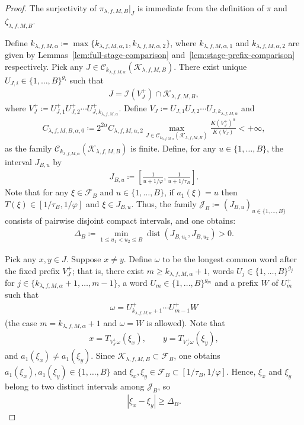 \documentclass[12pt,reqno]{amsart}
\theoremstyle{definition}
\theoremstyle{plain}
\begin{document}
\begin{proof}
The surjectivity of $\pi_{\lambda,f,M,B}|_J$ is immediate from the definition of $\pi$ and $\zeta_{\lambda,f,M,B}$.

Define $k_{\lambda,f,M,\alpha}\coloneqq \max{\{k_{\lambda,f,M,\alpha,1},k_{\lambda,f,M,\alpha,2}\}}$, where $k_{\lambda,f,M,\alpha,1}$ and $k_{\lambda,f,M,\alpha,2}$ are given by Lemmas~\ref{lem:full-stage-comparison} and~\ref{lem:stage-prefix-comparison} respectively.
Pick any $J\in\mathscr{C}_{k_{\lambda,f,M,\alpha}}(\mathcal{K}_{\lambda,f,M,B})$. There exist unique $U_{J,i}\in\{1,\ldots,B\}^{g_i}$ such that 
\begin{align*}
    J=\mathcal{I}(V^+_J)\cap\mathcal{K}_{\lambda,f,M,B},
\end{align*}
where $V^+_J\coloneqq U_{J,1}^+U_{J,2}^+\cdots U_{J,k_{\lambda,f,M,\alpha}}^+$. Define $V_J\coloneqq U_{J,1}U_{J,2}\cdots U_{J,k_{\lambda,f,M,\alpha}}$ and
\begin{align*}
    C_{\lambda,f,M,B,\alpha,0}
    \coloneqq 2^{2\alpha}C_{\lambda,f,M,\alpha,2}
    \max_{J\in\mathscr{C}_{k_{\lambda,f,M,\alpha}}(\mathcal{K}_{\lambda,f,M,B})}{\frac{K(V^+_J)^\alpha}{K(V_J)}}<+\infty,
\end{align*}
as the family $\mathscr{C}_{k_{\lambda,f,M,\alpha}}(\mathcal{K}_{\lambda,f,M,B})$ is finite. Define, for any $u\in\{1,\dots,B\}$, the interval $J_{B,u}$ by
\begin{align*}
    J_{B,u}\coloneqq
    \left[
    \frac{1}{u+1/\varphi},
    \frac{1}{u+1/\tau_B}
    \right].
\end{align*}
Note that for any $\xi\in\mathcal{F}_B$ and $u\in\{1,\ldots,B\}$, if $a_1(\xi)=u$ then $T(\xi)\in[1/\tau_B,1/\varphi]$ and $\xi\in J_{B,u}$. Thus, the family $\mathscr{J}_B\coloneqq(J_{B,u})_{u\in\{1,\ldots,B\}}$ consists of pairwise disjoint compact intervals, and one obtains:
\begin{align*}
    \Delta_B
    \coloneqq
    \min_{1\leq u_1<u_2\leq B}\operatorname{dist}{\left(J_{B,u_1},J_{B,u_2}\right)}>0.
\end{align*}

Pick any $x,y\in J$. Suppose $x\ne y$. Define $\omega$ to be the longest common word after the fixed prefix $V^+_J$; that is, there exist $m\geq k_{\lambda,f,M,\alpha}+1$, words $U_j\in\{1,\ldots,B\}^{g_j}$ for $j\in\{k_{\lambda,f,M,\alpha}+1,\ldots,m-1\}$, a word $U_m\in\{1,\ldots,B\}^{g_m}$ and a prefix $W$ of $U_m^+$ such that
\begin{align*}
    \omega=U^+_{k_{\lambda,f,M,\alpha}+1}\cdots U^+_{m-1}W
\end{align*}
(the case $m=k_{\lambda,f,M,\alpha}+1$ and $\omega=W$ is allowed). Note that
\begin{align*}
    x=T_{V^+_J\omega}(\xi_x), \qquad
    y=T_{V^+_J\omega}(\xi_y),
\end{align*}
and $a_1(\xi_x)\ne a_1(\xi_y)$. Since $\mathcal{K}_{\lambda,f,M,B}\subset\mathcal{F}_B$, one obtains $a_1(\xi_x),a_1(\xi_y)\in\{1,\dots,B\}$ and $\xi_x,\xi_y\in\mathcal{F}_B\subset[1/\tau_B,1/\varphi]$. Hence, $\xi_x$ and $\xi_y$ belong to two distinct intervals among $\mathscr{J}_B$, so
\begin{align*}
    |\xi_x-\xi_y|\geq \Delta_B.
\end{align*}


\end{proof}
\end{document}
